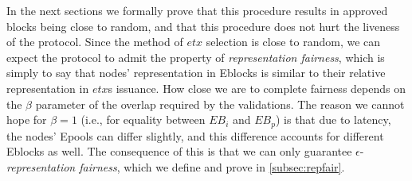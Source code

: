 




In the next sections we formally prove that this procedure results in approved blocks being close to random, and that this procedure does not hurt the liveness of the protocol. Since the method of $etx$ selection is close to random, we can expect the protocol to admit the property of \textit{representation fairness}, which is simply to say that nodes' representation in Eblocks is similar to their relative representation in $etx$s issuance. How close we are to complete fairness depends on the $\beta$ parameter of the overlap required by the validations. The reason we cannot hope for $\beta=1$ (i.e., for equality between $EB_i$ and $EB_p$) is that due to latency, the nodes' Epools can differ slightly, and this difference accounts for different Eblocks as well. The consequence of this is that we can only guarantee $\epsilon$-\textit{representation fairness}, which we define and prove in \ref{subsec:repfair}.

